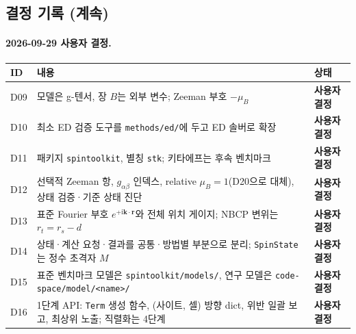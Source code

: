 \subsection{결정 기록 (계속)}\label{decisions-continued}
\begingroup%
  \framesubtitle{2026-09-29 사용자 결정.}
  \small\renewcommand{\arraystretch}{1.12}
  \begin{tabularx}{\textwidth}{@{}p{0.7cm}YP{2.5cm}@{}}
    \toprule
    ID & 내용 & 상태 \\
    \midrule
    D09 & 모델은 g-텐서, 장 $B$는 외부 변수; Zeeman 부호 $-\mu_B$ & \textbf{사용자 결정} \\
    D10 & 최소 ED 검증 도구를 \texttt{methods/ed/}에 두고 ED 솔버로 확장 & \textbf{사용자 결정} \\
    D11 & 패키지 \texttt{spintoolkit}, 별칭 \texttt{stk}; 키타에프는 후속 벤치마크 & \textbf{사용자 결정} \\
    D12 & 선택적 Zeeman 항, $g_{\alpha\beta}$ 인덱스, relative $\mu_B=1$(D20으로 대체), 상태 검증·기준 상태 진단 & \textbf{사용자 결정} \\
    D13 & 표준 Fourier 부호 $e^{+\mathrm i\mathbf k\cdot\mathbf r}$와 전체 위치 게이지; NBCP 변위는 $r_t=r_s-d$ & \textbf{사용자 결정} \\
    D14 & 상태·계산 요청·결과를 공통·방법별 부분으로 분리; \texttt{SpinState}는 정수 초격자 $M$ & \textbf{사용자 결정} \\
    D15 & 표준 벤치마크 모델은 \texttt{spintoolkit/models/}, 연구 모델은 \texttt{code-space/model/<name>/} & \textbf{사용자 결정} \\
    D16 & 1단계 API: \texttt{Term} 생성 함수, (사이트, 셀) 방향 dict, 위반 일괄 보고, 최상위 노출; 직렬화는 4단계 & \textbf{사용자 결정} \\
    \bottomrule
  \end{tabularx}
  \par\smallskip
\endgroup


